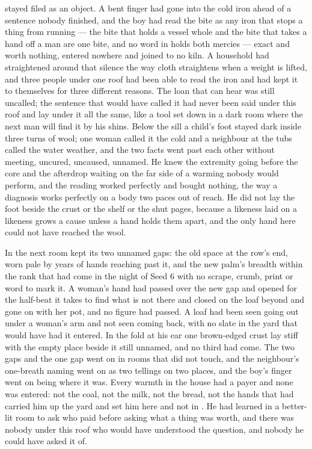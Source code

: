  stayed filed as an object. A bent finger had gone into the cold iron ahead of a sentence nobody finished, and the boy had read the bite as any iron that stops a thing from running --- the bite that holds a vessel whole and the bite that takes a hand off a man are one bite, and no word in  holds both mercies --- exact and worth nothing, entered nowhere and joined to no kiln. A household had straightened around that silence the way cloth straightens when a weight is lifted, and three people under one roof had been able to read the iron and had kept it to themselves for three different reasons. The loan that can hear was still uncalled; the sentence that would have called it had never been said under this roof and lay under it all the same, like a tool set down in a dark room where the next man will find it by his shins. Below the sill a child's foot stayed dark inside three turns of wool; one woman called it the cold and a neighbour at the tubs called the water weather, and the two facts went past each other without meeting, uncured, uncaused, unnamed. He knew the extremity going before the core and the afterdrop waiting on the far side of a warming nobody would perform, and the reading worked perfectly and bought nothing, the way a diagnosis works perfectly on a body two paces out of reach. He did not lay the foot beside the crust or the shelf or the shut pages, because a likeness laid on a likeness grows a cause unless a hand holds them apart, and the only hand here could not have reached the wool.

In the next room  kept its two unnamed gaps: the old space at the row's end, worn pale by years of hands reaching past it, and the new palm's breadth within the rank that had come in the night of Seed 6 with no scrape, crumb, print or word to mark it. A woman's hand had passed over the new gap and opened for the half-beat it takes to find what is not there and closed on the loaf beyond and gone on with her pot, and no figure had passed. A loaf had been seen going out under a woman's arm and not seen coming back, with no slate in the yard that would have had it entered. In the fold at his ear one brown-edged crust lay stiff with the empty place beside it still unnamed, and no third had come. The two gaps and the one gap went on in rooms that did not touch, and the neighbour's one-breath naming went on as two tellings on two places, and the boy's finger went on being where it was. Every warmth in the house had a payer and none was entered: not the coal, not the milk, not the bread, not the hands that had carried him up the yard and set him here and not in . He had learned in a better-lit room to ask who paid before asking what a thing was worth, and there was nobody under this roof who would have understood the question, and nobody he could have asked it of.

